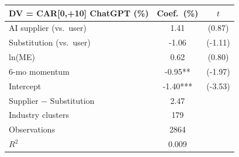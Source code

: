 \begin{tabular}{lcc}
\toprule
DV = CAR[0,+10] ChatGPT (\%) & Coef.\ (\%) & $t$ \\
\midrule
AI supplier (vs.\ user) & 1.41 & (0.87) \\
Substitution (vs.\ user) & -1.06 & (-1.11) \\
ln(ME) & 0.62 & (0.80) \\
6-mo momentum & -0.95** & (-1.97) \\
Intercept & -1.40*** & (-3.53) \\
Supplier $-$ Substitution & 2.47 & \\
\midrule
Industry clusters & 179 & \\
Observations & 2864 & \\
$R^2$ & 0.009 & \\
\bottomrule
\end{tabular}